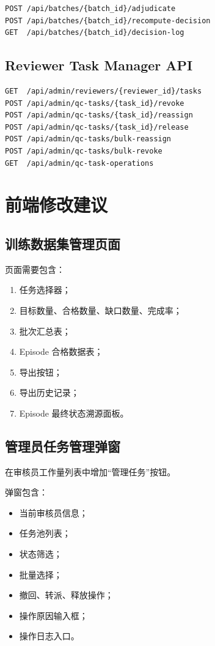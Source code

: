\documentclass[UTF8,12pt,a4paper]{ctexart}
\begin{document}
\begin{lstlisting}
POST /api/batches/{batch_id}/adjudicate
POST /api/batches/{batch_id}/recompute-decision
GET  /api/batches/{batch_id}/decision-log
\end{lstlisting}

\subsection{Reviewer Task Manager API}

\begin{lstlisting}
GET  /api/admin/reviewers/{reviewer_id}/tasks
POST /api/admin/qc-tasks/{task_id}/revoke
POST /api/admin/qc-tasks/{task_id}/reassign
POST /api/admin/qc-tasks/{task_id}/release
POST /api/admin/qc-tasks/bulk-reassign
POST /api/admin/qc-tasks/bulk-revoke
GET  /api/admin/qc-task-operations
\end{lstlisting}

\section{前端修改建议}

\subsection{训练数据集管理页面}

页面需要包含：

\begin{enumerate}
  \item 任务选择器；
  \item 目标数量、合格数量、缺口数量、完成率；
  \item 批次汇总表；
  \item Episode 合格数据表；
  \item 导出按钮；
  \item 导出历史记录；
  \item Episode 最终状态溯源面板。
\end{enumerate}

\subsection{管理员任务管理弹窗}

在审核员工作量列表中增加“管理任务”按钮。

弹窗包含：

\begin{itemize}
  \item 当前审核员信息；
  \item 任务池列表；
  \item 状态筛选；
  \item 批量选择；
  \item 撤回、转派、释放操作；
  \item 操作原因输入框；
  \item 操作日志入口。
\end{itemize}
\end{document}
